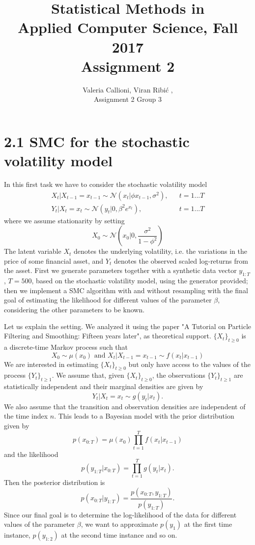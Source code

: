 \documentclass[]{article}
\title{Statistical Methods in \\ Applied Computer Science, Fall 2017 \\ Assignment 2}
\author{Valeria Callioni, Viran Ribi\'c , \\ Assignment 2 Group 3}
\begin{document}
	\maketitle
	
	\newpage
	
	\section*{2.1 SMC for the stochastic volatility model}
	In this first task we have to consider the stochastic volatility model
	\begin{align*}
	X_t|X_{t-1} = x_{t-1} \sim \mathcal{N}(x_t | \phi x_{t-1},\sigma^2), && t=1...T 
	\\
	Y_t|X_t = x_t \sim \mathcal{N}(y_t | 0, \beta^2e^{x_t}), && t=1...T 
	\end{align*}
	where we assume stationarity by setting 
	$$
	X_0 \sim \mathcal{N}(x_0 | 0, \frac{\sigma^2}{1-\phi^2})
	$$
	The latent variable $X_t$ denotes the underlying volatility, i.e. the variations in the price of some ﬁnancial asset, and $Y_t$ denotes the observed scaled log-returns from the asset. 
	First we generate parameters together with a synthetic data vector $y_{1:T}$, $T = 500$, based on the stochastic volatility model, using the generator provided; then we implement a SMC algorithm with and without resampling with the final goal of estimating the likelihood for different values of the parameter $\beta$, considering the other parameters to be known. 
	
	Let us explain the setting. We analyzed it using the paper "A Tutorial on Particle Filtering and Smoothing: Fifteen years later", as theoretical support. $\{X_t\}_{t\geq0}$ is a discrete-time Markov process such that 
	$$
	X_0 \sim \mu(x_0) \text{ and } X_t|X_{t-1} = x_{t-1} \sim f(x_t|x_{t-1})
	$$
	We are interested in estimating $\{X_t\}_{t\geq0}$ but only have access to the values of the process $\{Y_t\}_{t\geq1}$. We assume that, given $\{X_t\}_{t\geq0}$, the observations $\{Y_t\}_{t\geq1}$ are statistically independent and their marginal densities are given by
	$$
	Y_t|X_t = x_t \sim g(y_t|x_t).
	$$
	We also assume that the transition and observation densities are independent of the time index $n$. This leads to a Bayesian model with the prior distribution given by 
	$$
	p(x_{0:T}) = \mu(x_0)\prod_{t=1}^{T}f(x_t|x_{t-1})
	$$
	and the likelihood
	$$
	p(y_{1:T}|x_{0:T}) = \prod_{t=1}^{T}g(y_t|x_t).
	$$
	Then the posterior distribution is
	$$
	p(x_{0:T}|y_{1:T}) = \frac{p(x_{0:T},y_{1:T})}{p(y_{1:T})}.
	$$
	Since our final goal is to determine the log-likelihood of the data for different values of the parameter $\beta$, we want to approximate $p(y_1)$ at the first time instance, $p(y_{1:2})$ at the second time instance and so on.
	
\end{document}
